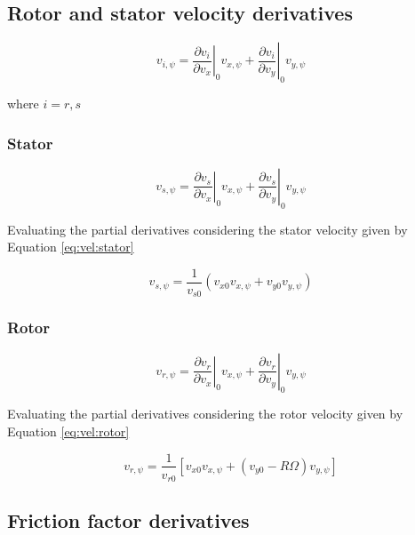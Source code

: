 \documentclass[12pt,letterpaper]{article}
\begin{document}
\subsection{Rotor and stator velocity derivatives}

\begin{equation}
v_{i,\psi} = 
\left. \frac{\partial v_i}{\partial v_{x}} \right|_{0} v_{x,\psi} +
\left. \frac{\partial v_i}{\partial v_{y}} \right|_{0} v_{y,\psi}
\end{equation}

where $i=r,s$

\subsubsection{Stator}

\begin{equation}
v_{s,\psi} = 
\left. \frac{\partial v_s}{\partial v_{x}} \right|_{0} v_{x,\psi} +
\left. \frac{\partial v_s}{\partial v_{y}} \right|_{0} v_{y,\psi}
\end{equation}

Evaluating the partial derivatives considering the stator velocity
given by Equation \ref{eq:vel:stator}

\begin{equation} \label{eq:vel_deriv:stator}
v_{s,\psi} = 
\frac{1}{v_{s0}} \left( v_{x0} v_{x,\psi}
+ v_{y0} v_{y,\psi} \right)
\end{equation}

\subsubsection{Rotor}

\begin{equation}
v_{r,\psi} = 
\left. \frac{\partial v_r}{\partial v_{x}} \right|_{0} v_{x,\psi} +
\left. \frac{\partial v_r}{\partial v_{y}} \right|_{0} v_{y,\psi}
\end{equation}

Evaluating the partial derivatives considering the rotor velocity
given by Equation \ref{eq:vel:rotor}

\begin{equation} \label{eq:vel_deriv:rotor}
v_{r,\psi} = 
\frac{1}{v_{r0}} \left[ v_{x0} v_{x,\psi}
+ \left( v_{y0} - R \Omega \right) v_{y,\psi} \right]
\end{equation}

\subsection{Friction factor derivatives}
\end{document}
